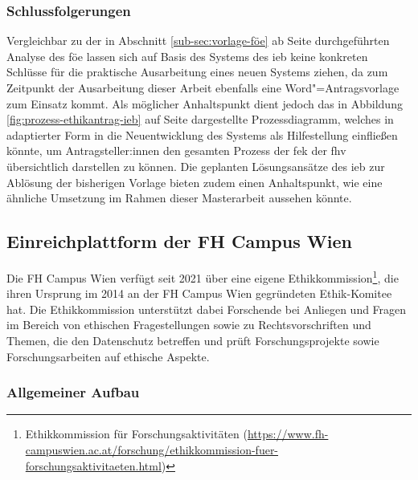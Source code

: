 \documentclass[a4paper,12pt,twoside]{scrreprt}
\begin{document}
\subsubsection*{Schlussfolgerungen}
\label{sub-sub-sec:schlussfolgerungen-fh-oö}

Vergleichbar zu der in Abschnitt \ref{sub-sec:vorlage-föe} ab Seite \pageref{sub-sec:vorlage-föe} durchgeführten Analyse des \ac{föe} lassen sich auf Basis des Systems des \ac{ieb} keine konkreten Schlüsse für die praktische Ausarbeitung eines neuen Systems ziehen, da zum Zeitpunkt der Ausarbeitung dieser Arbeit ebenfalls eine Word"=Antragsvorlage zum Einsatz kommt. Als möglicher Anhaltspunkt dient jedoch das in Abbildung \ref{fig:prozess-ethikantrag-ieb} auf Seite \pageref{fig:prozess-ethikantrag-ieb} dargestellte Prozessdiagramm, welches in adaptierter Form in die Neuentwicklung des Systems als Hilfestellung einfließen könnte, um Antragsteller:innen den gesamten Prozess der \ac{fek} der \ac{fhv} übersichtlich darstellen zu können. Die geplanten Lösungsansätze des \ac{ieb} zur Ablösung der bisherigen Vorlage bieten zudem einen Anhaltspunkt, wie eine ähnliche Umsetzung im Rahmen dieser Masterarbeit aussehen könnte.

\subsection{Einreichplattform der FH Campus Wien}
\label{sub-sec:einreichplattform-fh-campus-wien}

Die FH Campus Wien verfügt seit 2021 über eine eigene Ethikkommission\footnote{Ethikkommission für Forschungsaktivitäten (\url{https://www.fh-campuswien.ac.at/forschung/ethikkommission-fuer-forschungsaktivitaeten.html})}, die ihren Ursprung im 2014 an der FH Campus Wien gegründeten Ethik-Komitee hat. Die Ethikkommission unterstützt dabei Forschende bei Anliegen und Fragen im Bereich von ethischen Fragestellungen sowie zu Rechtsvorschriften und Themen, die den Datenschutz betreffen und prüft Forschungsprojekte sowie Forschungsarbeiten auf ethische Aspekte. \cite{fh_campus_wien_ethikkommission_2023}

\subsubsection*{Allgemeiner Aufbau}
\label{sub-sub-sec:fh-cw-allgemeiner-aufbau}
\end{document}
